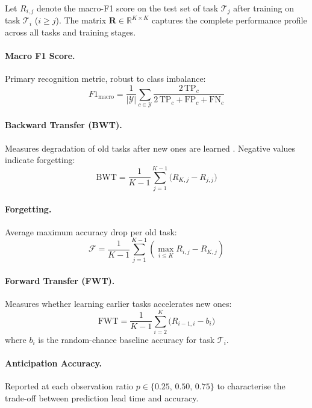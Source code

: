 Let $R_{i,j}$ denote the macro-F1 score on the test set of task
$\mathcal{T}_j$ after training on task $\mathcal{T}_i$ ($i \geq j$). The
matrix $\mathbf{R} \in \mathbb{R}^{K \times K}$ captures the complete
performance profile across all tasks and training stages.

\paragraph{Macro F1 Score.}
Primary recognition metric, robust to class imbalance:
\begin{equation}
    F1_{\mathrm{macro}} = \frac{1}{|\mathcal{Y}|}\sum_{c \in \mathcal{Y}}
    \frac{2\,\mathrm{TP}_c}{2\,\mathrm{TP}_c + \mathrm{FP}_c + \mathrm{FN}_c}
\end{equation}

\paragraph{Backward Transfer (BWT).}
Measures degradation of old tasks after new ones are learned
\cite{lopez2017gradient}. Negative values indicate forgetting:
\begin{equation}
    \mathrm{BWT} = \frac{1}{K-1}\sum_{j=1}^{K-1}
    \bigl(R_{K,j} - R_{j,j}\bigr)
    \label{eq:bwt}
\end{equation}

\paragraph{Forgetting.}
Average maximum accuracy drop per old task:
\begin{equation}
    \mathcal{F} = \frac{1}{K-1}\sum_{j=1}^{K-1}
    \left(\max_{i \leq K} R_{i,j} - R_{K,j}\right)
    \label{eq:forgetting}
\end{equation}

\paragraph{Forward Transfer (FWT).}
Measures whether learning earlier tasks accelerates new ones:
\begin{equation}
    \mathrm{FWT} = \frac{1}{K-1}\sum_{i=2}^{K}
    \bigl(R_{i-1,i} - b_i\bigr)
    \label{eq:fwt}
\end{equation}
where $b_i$ is the random-chance baseline accuracy for task $\mathcal{T}_i$.

\paragraph{Anticipation Accuracy.}
Reported at each observation ratio $p \in \{0.25,\,0.50,\,0.75\}$ to
characterise the trade-off between prediction lead time and accuracy.


